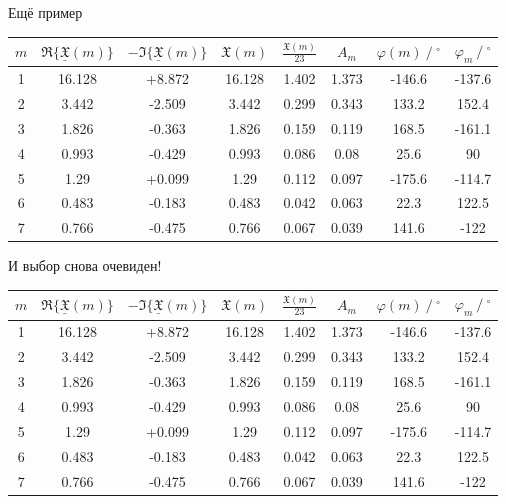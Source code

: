 \documentclass[aspectratio=169]{beamer} %
\begin{document}
\begin{frame}{Ещё пример} 
\centering
\tiny
\begin{tabular}{|c|c|c|c|c|c|c|c|} 
\hline
$m$ & $\Re\{\underline{\mathfrak{X}}(m)\}$ &$-\Im\{\underline{\mathfrak{X}}(m)\}$ & $\mathfrak{X}(m)$ & $\frac{\mathfrak{X}(m)}{23}$ & $A_m$ & $\varphi(m)\ /\ ^{\circ}$ & $\varphi_m\ /\ ^{\circ}$ \\ \hline
1  & 16.128 & +8.872 & 16.128 & 1.402 & 1.373 & -146.6 & -137.6 \\  \hline
2  & 3.442  & -2.509 & 3.442  & 0.299 & 0.343 & 133.2  & 152.4  \\  \hline
3  & 1.826  & -0.363 & 1.826  & 0.159 & 0.119 & 168.5  & -161.1 \\  \hline
4  & 0.993  & -0.429 & 0.993  & 0.086 & 0.08  & 25.6   & 90     \\  \hline
5  & 1.29   & +0.099 & 1.29   & 0.112 & 0.097 & -175.6 & -114.7 \\  \hline
6  & 0.483  & -0.183 & 0.483  & 0.042 & 0.063 & 22.3   & 122.5  \\  \hline
7  & 0.766  & -0.475 & 0.766  & 0.067 & 0.039 & 141.6  & -122   \\  \hline
\end{tabular}

\Large{\alert{И выбор снова очевиден!}}

\tiny
\begin{tabular}{cccccccc} \toprule
    {$m$} & {$\Re\{\underline{\mathfrak{X}}(m)\}$} & {$-\Im\{\underline{\mathfrak{X}}(m)\}$} & {$\mathfrak{X}(m)$} & {$\frac{\mathfrak{X}(m)}{23}$} & {$A_m$} & {$\varphi(m)\ /\ ^{\circ}$} & {$\varphi_m\ /\ ^{\circ}$} \\ \midrule
1  & 16.128 & +8.872 & 16.128 & 1.402 & 1.373 & -146.6 & -137.6 \\
 2  & 3.442  & -2.509 & 3.442  & 0.299 & 0.343 & 133.2  & 152.4  \\
 3  & 1.826  & -0.363 & 1.826  & 0.159 & 0.119 & 168.5  & -161.1 \\
4  & 0.993  & -0.429 & 0.993  & 0.086 & 0.08  & 25.6   & 90     \\
5  & 1.29   & +0.099 & 1.29   & 0.112 & 0.097 & -175.6 & -114.7 \\
6  & 0.483  & -0.183 & 0.483  & 0.042 & 0.063 & 22.3   & 122.5  \\
7  & 0.766  & -0.475 & 0.766  & 0.067 & 0.039 & 141.6  & -122   \\ \bottomrule
\end{tabular}
\end{frame}
\end{document}
